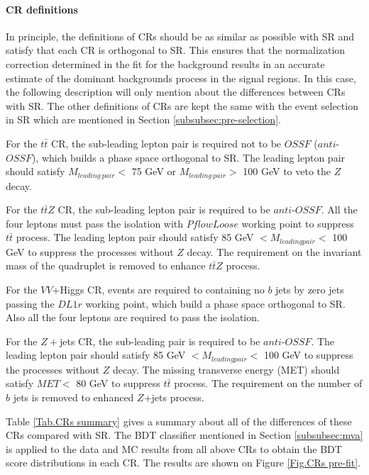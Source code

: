 \paragraph{CR definitions}

In principle, the definitions of CRs should be as similar as possible with SR and satisfy that each CR is orthogonal to SR. This ensures that the normalization correction determined in the fit for the background results in an accurate estimate of the dominant backgrounds process in the signal regions. In this case, the following description will only mention about the differences between CRs with SR. The other definitions of CRs are kept the same with the event selection in SR which are mentioned in Section \ref{subsubsec:pre-selection}.

For the $t\bar{t}$ CR, the sub-leading lepton pair is required not to be $OSSF$ ($anti$-$OSSF$), which builds a phase space orthogonal to SR. The leading lepton pair should satisfy $M_{ leading\ pair}<$ 75 GeV or $M_{ leading\ pair}>$ 100 GeV to veto the $Z$ decay.

For the $t\bar{t}Z$ CR, the sub-leading lepton pair is required to be $anti$-$OSSF$. All the four leptons must pass the isolation with $PflowLoose$ working point to suppress $t\bar{t}$ process. The leading lepton pair should satisfy 85 GeV $<M_{ leading pair}<$ 100 GeV to suppress the processes without $Z$ decay. The requirement on the invariant mass of the quadruplet is removed to enhance $t\bar{t}Z$ process.

For the $VV$+Higgs CR, events are required to containing no $b$ jets by zero jets passing the $DL1r$ working point, which build a phase space orthogonal to SR. Also all the four leptons are required to pass the isolation.

For the $Z+$jets CR, the sub-leading pair is required to be $anti$-$OSSF$. The leading lepton pair should satisfy 85 GeV $<M_{ leading pair}<$ 100 GeV to suppress the processes without $Z$ decay. The missing transverse energy (MET) should satisfy $MET<$ 80 GeV to suppress $t\bar{t}$ process. The requirement on the number of $b$ jets is removed to enhanced $Z$+jets process.

Table \ref{Tab.CRs summary} gives a summary about all of the differences of these CRs compared with SR. The BDT classifier mentioned in Section \ref{subsubsec:mva} is applied to the data and MC results from all above CRs to obtain the BDT score distributions in each CR. The results are shown on Figure \ref{Fig.CRs pre-fit}.

